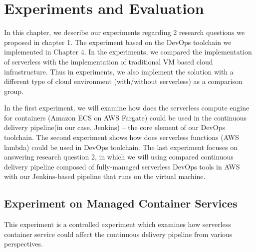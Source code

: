 \chapter{Experiments and Evaluation}
In this chapter, we describe our experiments regarding 2 research questions we proposed in chapter 1. The experiment based on the DevOps toolchain we implemented in Chapter 4. In the experiments, we compared the implementation of serverless with the implementation of traditional VM based cloud infrastructure. Thus in experiments, we also implement the solution with a different type of cloud environment (with/without serverless) as a comparison group.
\par
In the first experiment, we will examine how does the serverless compute engine for containers (Amazon ECS on AWS Fargate) could be used in the continuous delivery pipeline(in our case, Jenkins) -- the core element of our DevOps toolchain. The second experiment shows how does serverless functions (AWS lambda) could be used in DevOps toolchain. The last experiment focuses on answering research question 2, in which we will using compared continuous delivery pipeline composed of fully-managed serverless DevOps tools in AWS with our Jenkins-based pipeline that runs on the virtual machine.
\section{Experiment on Managed Container Services}
This experiment is a controlled experiment which examines how serverless container service could affect the continuous delivery pipeline from various perspectives.
